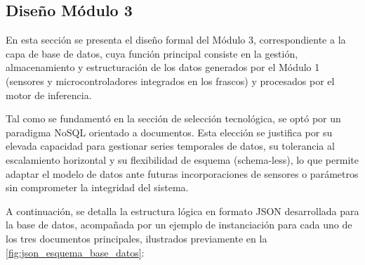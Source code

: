 \subsection{Diseño Módulo 3}
En esta sección se presenta el diseño formal del Módulo 3, correspondiente a la capa de base de datos, cuya función principal consiste en la gestión, almacenamiento y estructuración de los datos generados por el Módulo 1 (sensores y microcontroladores integrados en los frascos) y procesados por el motor de inferencia.

Tal como se fundamentó en la sección de selección tecnológica, se optó por un paradigma NoSQL orientado a documentos. Esta elección se justifica por su elevada capacidad para gestionar series temporales de datos, su tolerancia al escalamiento horizontal y su flexibilidad de esquema (schema-less), lo que permite adaptar el modelo de datos ante futuras incorporaciones de sensores o parámetros sin comprometer la integridad del sistema.

A continuación, se detalla la estructura lógica en formato JSON desarrollada para la base de datos, acompañada por un ejemplo de instanciación para cada uno de los tres documentos principales, ilustrados previamente en la \cref{fig:json_esquema_base_datos}:

